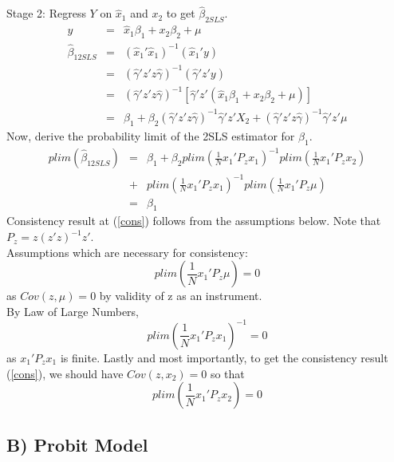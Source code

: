 \documentclass[11pt]{article}
\begin{document}
Stage 2: Regress $Y$ on $\hat{x}_{1}$ and $x_{2}$ to get $\hat{\beta}_{2SLS}$.
\begin{eqnarray}
y                  &=& \hat{x}_{1}\beta_{1}+ x_{2} \beta_{2} + \mu \nonumber \\
\hat{\beta}_{12SLS}&=& (\hat{x}_{1}'\hat{x}_{1})^{-1}(\hat{x}_{1}'y) \nonumber \\
                   &=& (\hat{\gamma}'z'z \hat{\gamma})^{-1}(\hat{\gamma}'z'y) \nonumber \\
                   &=& (\hat{\gamma}'z'z \hat{\gamma})^{-1}[\hat{\gamma}'z'(\hat{x}_{1}\beta_{1}+ x_{2} \beta_{2} + \mu)] \nonumber \\
                   &=& \beta_{1}+ \beta_{2} (\hat{\gamma}'z'z \hat{\gamma})^{-1} \hat{\gamma}'z'X_{2} + (\hat{\gamma}'z'z \hat{\gamma})^{-1} \hat{\gamma}'z' \mu \nonumber
\end{eqnarray}
Now, derive the probability limit of the 2SLS estimator for $\beta_{1}$.
\begin{eqnarray}
plim(\hat{\beta}_{12SLS}) &=& \beta_{1}+ \beta_{2}plim \left(\frac{1}{N}x_{1}'P_{z}x_{1}\right)^{-1} plim\left(\frac{1}{N} x_{1}'P_{z}x_{2} \right) \nonumber \\
                          &+& plim\left(\frac{1}{N}x_{1}'P_{z}x_{1}\right)^{-1}plim \left(\frac{1}{N}x_{1}'P_{z}\mu\right) \nonumber \\
                          &=& \beta_{1} \label{cons}
\end{eqnarray}
Consistency result at (\ref{cons}) follows from the assumptions below. Note that $P_{z}=z(z'z)^{-1}z'$. 
\\
Assumptions which are necessary for consistency:
\begin{equation}
plim \left( \frac{1}{N}x_{1}'P_{z}\mu \right) = 0
\end{equation}
as $Cov(z,\mu)=0$ by validity of z as an instrument.
\\
By Law of Large Numbers, 
\begin{equation}
plim\left(\frac{1}{N}x_{1}'P_{z}x_{1}\right)^{-1} = 0
\end{equation}
as $x_{1}'P_{z}x_{1}$ is finite.
Lastly and most importantly, to get the consistency result (\ref{cons}), we should have $Cov(z,x_{2})=0$ so that
\begin{equation}
plim\left(\frac{1}{N} x_{1}'P_{z}x_{2} \right) = 0
\end{equation}
\subsection*{B) Probit Model}
\end{document}
